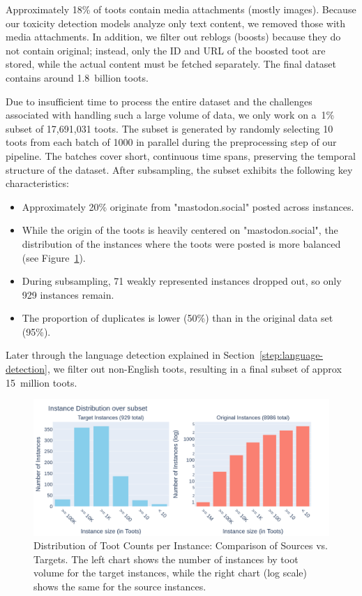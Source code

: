 Approximately 18\% of toots contain media attachments (mostly images). Because our toxicity detection models analyze only text content, we removed those with media attachments. In addition, we filter out reblogs (boosts) because they do not contain original; instead, only the ID and URL of the boosted toot are stored, while the actual content must be fetched separately. The final dataset contains around 1.8~billion toots.

Due to insufficient time to process the entire dataset and the challenges associated with handling such a large volume of data, we only work on a~1\% subset of 17,691,031 toots.  The subset is generated by randomly selecting 10 toots from each batch of 1000 in parallel during the preprocessing step of our pipeline. The batches cover short, continuous time spans, preserving the temporal structure of the dataset. After subsampling, the subset exhibits the following key characteristics:

\begin{itemize}
\item Approximately 20\% originate from "mastodon.social" posted across instances.
\item While the origin of the toots is heavily centered on "mastodon.social", the distribution of the instances where the toots were posted is more balanced (see Figure~\ref{instance-distribution}).
\item During subsampling, 71 weakly represented instances dropped out, so only 929 instances remain.
\item The proportion of duplicates is lower (50\%) than in the original data set (95\%).
\end{itemize}

Later through the language detection explained in Section~\ref{step:language-detection}, we filter out non-English toots, resulting in a final subset of approx 15~million toots.

\begin{figure}[tb]
    \centering
    \includegraphics[width=\textwidth]{../material/instance_distribution.png}
    \caption{Distribution of Toot Counts per Instance: Comparison of Sources vs. Targets. The left chart shows the number of instances by toot volume for the target instances, while the right chart (log scale) shows the same for the source instances.}
    \label{instance-distribution}
\end{figure}

